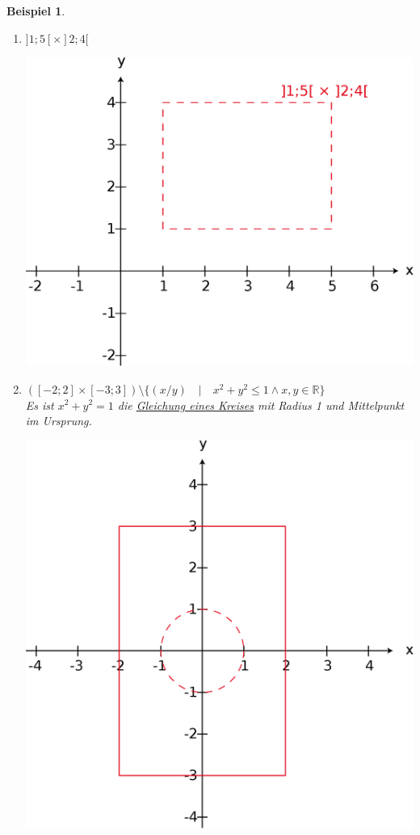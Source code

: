\documentclass{report}
\newtheorem{myexample}{Beispiel}
\begin{document}
\begin{myexample}
\begin{enumerate}
\item $]1;5[ \times ]2;4[$
\begin{center}\includegraphics[scale=0.25]{img/2_5-example-3.eps}\end{center}
\item $([-2 ; 2] \times [-3 ; 3]) \setminus \{(x/y) \quad | \quad x^2 + y^2 \leq 1 \land x,y \in \mathbb{R}\}$\\
Es ist $x^2 + y^2 = 1$ die \underline{Gleichung eines Kreises} mit Radius 1 und Mittelpunkt im Ursprung.
\begin{center}\includegraphics[scale=0.25]{img/2_5-example-4.eps}\end{center}
\end{enumerate}\end{myexample}
\end{document}
